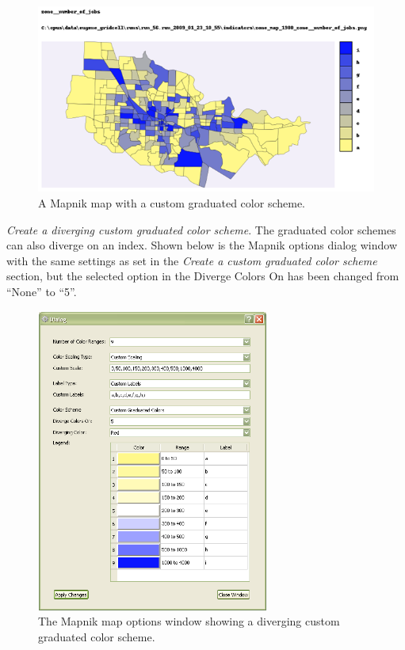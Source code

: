 \begin{figure}[hbp]
\begin{center}
\includegraphics[width=\textwidth]{part-gui/images/sample-map-custom-settings-2.png}
\end{center}
\caption{A Mapnik map with a custom graduated color scheme.}
\label{fig:sample-map-custom-settings-2}
\end{figure}
\clearpage

\emph{Create a diverging custom graduated color scheme}. The graduated color 
schemes can also diverge on an index. Shown below is the Mapnik options 
dialog window with the same settings as set in the 
\emph{Create a custom graduated color scheme} section, 
but the selected option in the Diverge Colors On has been changed 
from ``None'' to ``5''.

\begin{figure}[hb]
\begin{center}
\includegraphics[width=3in]{part-gui/images/result-manager-mapnik-options-example-3.png}
\end{center}
\caption{The Mapnik map options window showing a diverging custom graduated color scheme.}
\label{fig:result-manager-mapnik-options-example-3}
\end{figure}
\clearpage

